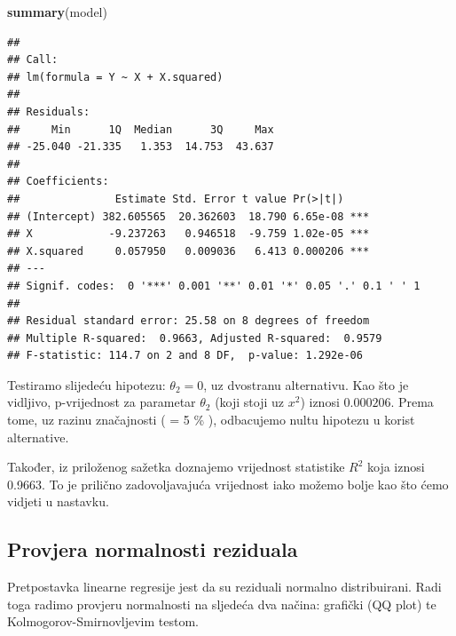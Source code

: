 \documentclass[]{article}
\newenvironment{Shaded}{\begin{snugshade}}{\end{snugshade}}
\newcommand{\KeywordTok}[1]{\textcolor[rgb]{0.13,0.29,0.53}{\textbf{{#1}}}}
\newcommand{\DataTypeTok}[1]{\textcolor[rgb]{0.13,0.29,0.53}{{#1}}}
\newcommand{\DecValTok}[1]{\textcolor[rgb]{0.00,0.00,0.81}{{#1}}}
\newcommand{\StringTok}[1]{\textcolor[rgb]{0.31,0.60,0.02}{{#1}}}
\newcommand{\NormalTok}[1]{{#1}}
\begin{document}
\begin{Shaded}
\begin{Highlighting}[]
\KeywordTok{summary}\NormalTok{(model)}
\end{Highlighting}
\end{Shaded}

\begin{verbatim}
## 
## Call:
## lm(formula = Y ~ X + X.squared)
## 
## Residuals:
##     Min      1Q  Median      3Q     Max 
## -25.040 -21.335   1.353  14.753  43.637 
## 
## Coefficients:
##               Estimate Std. Error t value Pr(>|t|)    
## (Intercept) 382.605565  20.362603  18.790 6.65e-08 ***
## X            -9.237263   0.946518  -9.759 1.02e-05 ***
## X.squared     0.057950   0.009036   6.413 0.000206 ***
## ---
## Signif. codes:  0 '***' 0.001 '**' 0.01 '*' 0.05 '.' 0.1 ' ' 1
## 
## Residual standard error: 25.58 on 8 degrees of freedom
## Multiple R-squared:  0.9663, Adjusted R-squared:  0.9579 
## F-statistic: 114.7 on 2 and 8 DF,  p-value: 1.292e-06
\end{verbatim}

Testiramo slijedeću hipotezu: \(\theta_2 = 0\), uz dvostranu
alternativu. Kao što je vidljivo, p-vrijednost za parametar \(\theta_2\)
(koji stoji uz \(x^ 2\)) iznosi \(0.000206\). Prema tome, uz razinu
značajnosti ( \alpha = 5 \% ), odbacujemo nultu hipotezu u korist
alternative.

Također, iz priloženog sažetka doznajemo vrijednost statistike \(R^2\)
koja iznosi 0.9663. To je prilično zadovoljavajuća vrijednost iako
možemo bolje kao što ćemo vidjeti u nastavku.

\subsection{Provjera normalnosti
reziduala}\label{provjera-normalnosti-reziduala}

Pretpostavka linearne regresije jest da su reziduali normalno
distribuirani. Radi toga radimo provjeru normalnosti na sljedeća dva
načina: grafički (QQ plot) te Kolmogorov-Smirnovljevim testom.

\begin{Shaded}
\end{Shaded}
\end{document}
